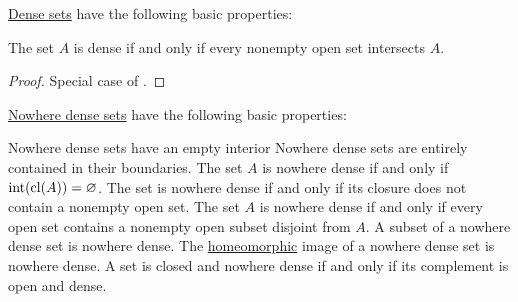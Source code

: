 \begin{proposition}\label{thm:dense_set_properties}
  \hyperref[def:topologically_dense_set/dense]{Dense sets} have the following basic properties:
  \begin{thmenum}
    \mcite\cite[prop. 1.3.5]{Engelking1989} The set \( A \) is dense if and only if every nonempty open set intersects \( A \).
  \end{thmenum}
\end{proposition}
\begin{proof}
   Special case of .
\end{proof}

\begin{proposition}\label{thm:nowhere_dense_properties}
  \hyperref[def:topologically_dense_set/nowhere_dense]{Nowhere dense sets} have the following basic properties:
  \begin{thmenum}
     Nowhere dense sets have an empty interior
     Nowhere dense sets are entirely contained in their boundaries.
     The set \( A \) is nowhere dense if and only if \( \operatorname{int}(\operatorname{cl}(A)) = \varnothing \).
     The set is nowhere dense if and only if its closure does not contain a nonempty open set.
    \mcite\cite[prop. 1.3.5]{Engelking1989}The set \( A \) is nowhere dense if and only if every open set contains a nonempty open subset disjoint from \( A \).
     A subset of a nowhere dense set is nowhere dense.
     The \hyperref[def:homeomorphism]{homeomorphic} image of a nowhere dense set is nowhere dense.
     A set is closed and nowhere dense if and only if its complement is open and dense.
  \end{thmenum}
\end{proposition}
